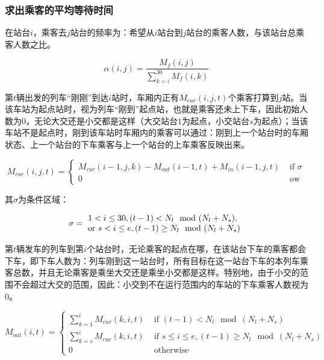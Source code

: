 \subsubsection{求出乘客的平均等待时间}

在站台$i$，乘客去$j$站台的频率为：希望从$i$站台到$j$站台的乘客人数，与该站台总乘客人数之比。

\begin{equation}
\alpha(i, j) = 
	\frac {M_f(i, j)}{\sum _{k = i} ^{30} M_f(i, k)}
\end{equation}

第$t$辆出发的列车“刚刚”到达$i$站时，车厢内正有$M_{cur}(i, j, t)$个乘客打算到$j$站。当该车站为起点站时，视为列车“刚到”起点站，也就是乘客还未上下车，因此初始人数为$0$，无论大交还是小交都是这样（大交站台$1$为起点，小交站台$s$为起点）；当该车站不是起点时，刚到该车站时车厢内的乘客可以通过：刚到上一个站台时的车厢状态、上一个站台的下车乘客与上一个站台的上车乘客反映出来。

\begin{equation}
M_{cur}(i, j, t) = 
	\begin{cases}
	M_{cur}(i - 1, j, k) - M_{out}(i - 1, t) + M_{in}(i - 1, j, t)  & \text{ if }\sigma \\
	0  & \text{ ow }
	\end{cases}
\end{equation}

其$\sigma$为条件区域：

\begin{equation}
    \sigma = 
        \begin{matrix}
 		1 < i \leq 30, (t - 1) < N_l \mod (N_l + N_s),  \\
		\text{ or } s < i \leq e, (t - 1) \geq N_l \mod (N_l + N_s)\\
		\end{matrix} \\
\end{equation}

第$t$辆发车的列车到第$i$个站台时，无论乘客的起点在哪，在该站台下车的乘客都会下车，即下车人数为：列车刚到这一站台时，所有目标在这一站台下车的本列车乘客总数，并且无论乘客是乘坐大交还是乘坐小交都是这样。特别地，由于小交的范围不会超过大交的范围，因此：小交到不在运行范围内的车站的下车乘客人数视为$0$。

\begin{equation}
M_{out}(i, t) = 
	\begin{cases}
	\sum _{k = 1} ^{i} M_{cur}(k, i, t)  & \text{ if } (t - 1) < N_l \mod (N_l + N_s) \\
	\sum _{k = s} ^{i} M_{cur}(k, i, t)  & \text{ if } s \leq i \leq e, (t - 1) \geq N_l \mod (N_l + N_s) \\
	0 & \text{ otherwise }
	\end{cases}
\end{equation}

